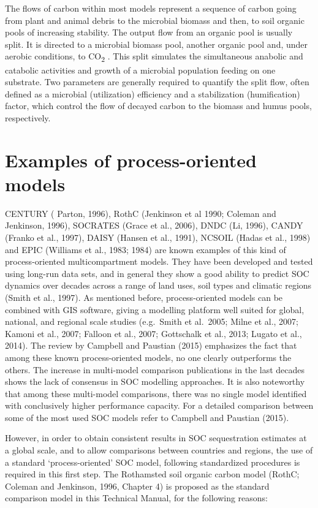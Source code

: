 \documentclass[
  10pt,
  b5paper,
]{book}
\begin{document}
The flows of carbon within most models represent a sequence of carbon going from plant and animal debris to the microbial biomass and then, to soil organic pools of increasing stability. The output flow from an organic pool is usually split. It is directed to a microbial biomass pool, another organic pool and, under aerobic conditions, to CO\textsubscript{2} . This split simulates the simultaneous anabolic and catabolic activities and growth of a microbial population feeding on one substrate. Two parameters are generally required to quantify the split flow, often defined as a microbial (utilization) efficiency and a stabilization (humification) factor, which control the flow of decayed carbon to the biomass and humus pools, respectively.

\hypertarget{examples-of-process-oriented-models}{%
\section{Examples of process-oriented models}\label{examples-of-process-oriented-models}}

CENTURY ( Parton, 1996), RothC (Jenkinson et al 1990; Coleman and Jenkinson, 1996), SOCRATES (Grace et al., 2006), DNDC (Li, 1996), CANDY (Franko et al., 1997), DAISY (Hansen et al., 1991), NCSOIL (Hadas et al., 1998) and EPIC (Williams et al., 1983; 1984) are known examples of this kind of process-oriented multicompartment models. They have been developed and tested using long-run data sets, and in general they show a good ability to predict SOC dynamics over decades across a range of land uses, soil types and climatic regions (Smith et al., 1997). As mentioned before, process-oriented models can be combined with GIS software, giving a modelling platform well suited for global, national, and regional scale studies (e.g.~Smith et al.~2005; Milne et al., 2007; Kamoni et al., 2007; Falloon et al., 2007; Gottschalk et al., 2013; Lugato et al., 2014).
The review by Campbell and Paustian (2015) emphasizes the fact that among these known process-oriented models, no one clearly outperforms the others. The increase in multi-model comparison publications in the last decades shows the lack of consensus in SOC modelling approaches. It is also noteworthy that among these multi-model comparisons, there was no single model identified with conclusively higher performance capacity. For a detailed comparison between some of the most used SOC models refer to Campbell and Paustian (2015).

However, in order to obtain consistent results in SOC sequestration estimates at a global scale, and to allow comparisons between countries and regions, the use of a standard `process-oriented' SOC model, following standardized procedures is required in this first step.
The Rothamsted soil organic carbon model (RothC; Coleman and Jenkinson, 1996, Chapter 4) is proposed as the standard comparison model in this Technical Manual, for the following reasons:
\end{document}
